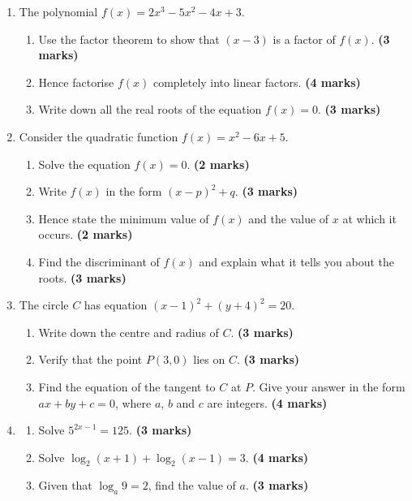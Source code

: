 \documentclass{../Templates/sbs-exam}
\newcommand{\imarks}[1]{\hfill \textbf{(#1 marks)}}
\begin{document}
\begin{enumerate}

\item %
The polynomial $f(x) = 2x^3 - 5x^2 - 4x + 3$.
\begin{enumerate}
    \item Use the factor theorem to show that $(x-3)$ is a factor of $f(x)$. \imarks{3}
    \item Hence factorise $f(x)$ completely into linear factors. \imarks{4}
    \item Write down all the real roots of the equation $f(x)=0$. \imarks{3}
\end{enumerate}
\vspace{8cm}

\item %
Consider the quadratic function $f(x) = x^2 - 6x + 5$.
\begin{enumerate}
    \item Solve the equation $f(x)=0$. \imarks{2}
    \item Write $f(x)$ in the form $(x-p)^2 + q$. \imarks{3}
    \item Hence state the minimum value of $f(x)$ and the value of $x$ at which it occurs. \imarks{2}
    \item Find the discriminant of $f(x)$ and explain what it tells you about the roots. \imarks{3}
\end{enumerate}
\vspace{8cm}

\item %
The circle $C$ has equation $(x-1)^2 + (y+4)^2 = 20$.
\begin{enumerate}
    \item Write down the centre and radius of $C$. \imarks{3}
    \item Verify that the point $P(3,0)$ lies on $C$. \imarks{3}
    \item Find the equation of the tangent to $C$ at $P$. Give your answer in the form $ax+by+c=0$, where $a$, $b$ and $c$ are integers. \imarks{4}
\end{enumerate}
\vspace{8cm}

\item %
\begin{enumerate}
    \item Solve $5^{2x-1} = 125$. \imarks{3}
    \item Solve $\log_2(x+1) + \log_2(x-1) = 3$. \imarks{4}
    \item Given that $\log_a 9 = 2$, find the value of $a$. \imarks{3}
\end{enumerate}
\vspace{6cm}

\end{enumerate}
\end{document}
